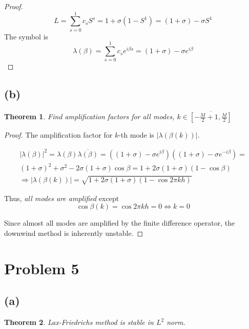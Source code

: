 \documentclass[a4paper]{amsproc}
\theoremstyle{plain}
\newtheorem*{thm}{Theorem}
\theoremstyle{definition}
\theoremstyle{remark}
\numberwithin{equation}{section}
\begin{document}
  \begin{proof}
  $$L = \sum\limits_{s=0}^{1} c_s S^s = 1 + \sigma (1 - S^1) = (1+\sigma) - \sigma S^1 $$
  The symbol is $$ \lambda(\beta) = \sum\limits_{s=0}^{1} c_s e^{i \beta s} = (1+\sigma) - \sigma e^{i \beta}$$
  \end{proof}

\subsection*{(b)}

  \begin{thm}
  Find amplification factors for all modes, $k \in \overline{[-\frac{M}{2}+1, \frac{M}{2}]}$
  \end{thm}

  \begin{proof}
  The amplification factor for $k$-th mode is $\lvert \lambda(\beta(k)) \rvert$.
  
  \begin{multline} \lvert \lambda(\beta) \rvert^2 = \lambda(\beta)\overline{\lambda(\beta)} = ((1+\sigma) - \sigma e^{i \beta})((1+\sigma) - \sigma e^{-i \beta}) = \\
   (1+\sigma)^2 + \sigma^2 -2\sigma(1+\sigma)\cos\beta = 1 + 2\sigma(1+\sigma)(1-\cos\beta) \\
   \Longrightarrow \lvert \lambda(\beta(k)) \rvert = \sqrt{1 + 2\sigma(1+\sigma)(1-\cos 2\pi kh)}
   \end{multline}
   
   Thus, \emph{all modes are amplified} except $$ \cos\beta(k) = \cos 2\pi kh = 0 \Longleftrightarrow k = 0 $$
   
   Since almost all modes are amplified by the finite difference operator, the downwind method is inherently unstable.
  
  \end{proof}

\section*{Problem 5}

\subsection*{(a)}

\begin{thm} 
Lax-Friedrichs method is stable in $L^2$ norm.
\end{thm}
\end{document}
